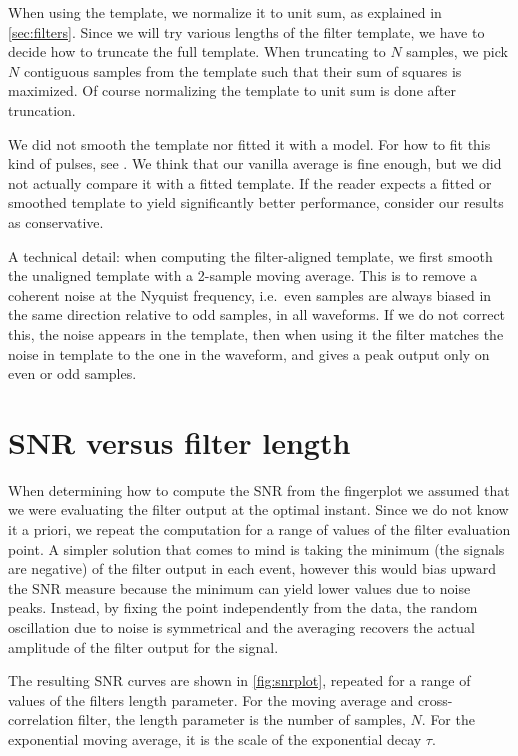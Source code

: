 When using the template, we normalize it to unit sum, as explained in
\autoref{sec:filters}. Since we will try various lengths of the filter
template, we have to decide how to truncate the full template. When truncating
to $N$ samples, we pick $N$ contiguous samples from the template such that
their sum of squares is maximized. Of course normalizing the template to unit
sum is done after truncation.

We did not smooth the template nor fitted it with a model. For how to fit this
kind of pulses, see \cite{luzzi2020}. We think that our vanilla average is fine
enough, but we did not actually compare it with a fitted template. If the
reader expects a fitted or smoothed template to yield significantly better
performance, consider our results as conservative.

A technical detail: when computing the filter-aligned template, we first smooth
the unaligned template with a 2-sample moving average. This is to remove a
coherent noise at the Nyquist frequency, i.e.\ even samples are always biased
in the same direction relative to odd samples, in all waveforms. If we do not
correct this, the noise appears in the template, then when using it the filter
matches the noise in template to the one in the waveform, and gives a peak
output only on even or odd samples.

\section{SNR versus filter length}

When determining how to compute the SNR from the fingerplot we assumed that we
were evaluating the filter output at the optimal instant. Since we do not know
it a priori, we repeat the computation for a range of values of the filter
evaluation point. A simpler solution that comes to mind is taking the minimum
(the signals are negative) of the filter output in each event, however this
would bias upward the SNR measure because the minimum can yield lower values
due to noise peaks. Instead, by fixing the point independently from the data,
the random oscillation due to noise is symmetrical and the averaging recovers
the actual amplitude of the filter output for the signal.

The resulting SNR curves are shown in \autoref{fig:snrplot}, repeated for a
range of values of the filters length parameter. For the moving average and
cross-correlation filter, the length parameter is the number of samples, $N$.
For the exponential moving average, it is the scale of the exponential decay
$\tau$.

